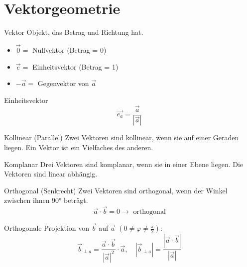 \graphicspath{{images/}}

\section{Vektorgeometrie}

\begin{definition}{Vektor}
    Objekt, das Betrag und Richtung hat.
    \begin{itemize}
        \item $\overrightarrow{0} = $ Nullvektor (Betrag = 0)
        \item $\overrightarrow{e} = $ Einheitsvektor (Betrag = 1)
        \item $-\overrightarrow{a} = $ Gegenvektor von $\overrightarrow{a}$
    \end{itemize}
\end{definition}

\begin{concept}{Einheitsvektor}
    $$\overrightarrow{e_a} = \frac{\overrightarrow{a}}{|\overrightarrow{a}|}$$  
\end{concept}

\begin{definition}{Kollinear (Parallel)}
    Zwei Vektoren sind kollinear, wenn sie auf einer Geraden liegen. Ein Vektor ist ein Vielfaches des anderen.
\end{definition}

\begin{definition}{Komplanar}
    Drei Vektoren sind komplanar, wenn sie in einer Ebene liegen. Die Vektoren sind linear abhängig.
\end{definition}

\begin{definition}{Orthogonal (Senkrecht)}
    Zwei Vektoren sind orthogonal, wenn der Winkel zwischen ihnen 90° beträgt. 
    $$\overrightarrow{a} \cdot \overrightarrow{b} = 0 \rightarrow \text{ orthogonal}$$
\end{definition}

\begin{concept}{Orthogonale Projektion}
    von $\overrightarrow{b}$ auf $\overrightarrow{a}$ $(0 \neq \varphi \neq \frac{\pi}{2})$:
    $$\overrightarrow{b}_{\perp a} = \frac{\overrightarrow{a} \cdot \overrightarrow{b}}{|\overrightarrow{a}|^2} \cdot \overrightarrow{a}, \quad |\overrightarrow{b}_{\perp a}| = \frac{|\overrightarrow{a} \cdot \overrightarrow{b}|}{|\overrightarrow{a}|}$$
\end{concept}

